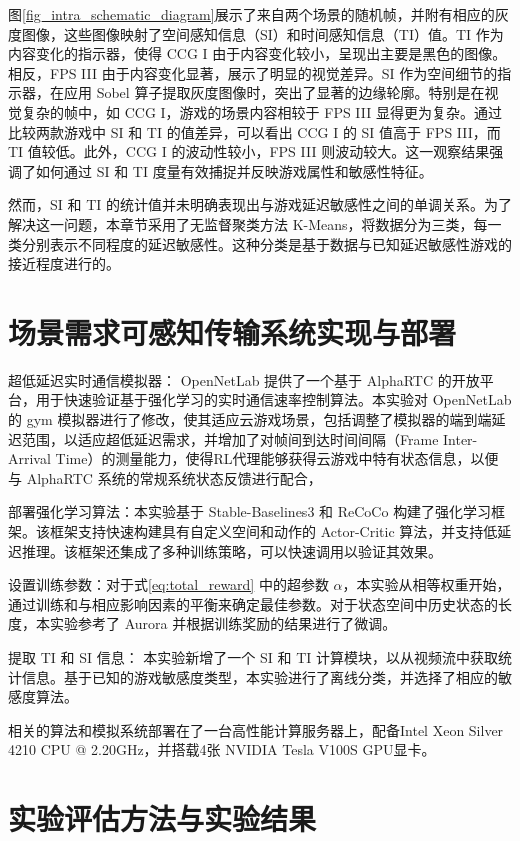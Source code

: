 图\ref{fig_intra_schematic_diagram}展示了来自两个场景的随机帧，并附有相应的灰度图像，这些图像映射了空间感知信息（SI）和时间感知信息（TI）值。TI 作为内容变化的指示器，使得 CCG I 由于内容变化较小，呈现出主要是黑色的图像。相反，FPS III 由于内容变化显著，展示了明显的视觉差异。SI 作为空间细节的指示器，在应用 Sobel 算子提取灰度图像时，突出了显著的边缘轮廓。特别是在视觉复杂的帧中，如 CCG I，游戏的场景内容相较于 FPS III 显得更为复杂。通过比较两款游戏中 SI 和 TI 的值差异，可以看出 CCG I 的 SI 值高于 FPS III，而 TI 值较低。此外，CCG I 的波动性较小，FPS III 则波动较大。这一观察结果强调了如何通过 SI 和 TI 度量有效捕捉并反映游戏属性和敏感性特征。

然而，SI 和 TI 的统计值并未明确表现出与游戏延迟敏感性之间的单调关系。为了解决这一问题，本章节采用了无监督聚类方法 K-Means，将数据分为三类，每一类分别表示不同程度的延迟敏感性。这种分类是基于数据与已知延迟敏感性游戏的接近程度进行的。

\section{场景需求可感知传输系统实现与部署}
超低延迟实时通信模拟器： OpenNetLab \cite{eo2022opennetlab} 提供了一个基于 AlphaRTC 的开放平台，用于快速验证基于强化学习的实时通信速率控制算法。本实验对 OpenNetLab 的 gym 模拟器进行了修改，使其适应云游戏场景，包括调整了模拟器的端到端延迟范围，以适应超低延迟需求，并增加了对帧间到达时间间隔（Frame Inter-Arrival Time）的测量能力，使得RL代理能够获得云游戏中特有状态信息，以便与 AlphaRTC 系统的常规系统状态反馈进行配合，

部署强化学习算法：本实验基于 Stable-Baselines3 \cite{stable-baselines3} 和 ReCoCo \cite{markudova2023recoco} 构建了强化学习框架。该框架支持快速构建具有自定义空间和动作的 Actor-Critic 算法，并支持低延迟推理。该框架还集成了多种训练策略，可以快速调用以验证其效果。

设置训练参数：对于式\eqref{eq:total_reward} 中的超参数 $\alpha$，本实验从相等权重开始，通过训练和与相应影响因素的平衡来确定最佳参数。对于状态空间中历史状态的长度，本实验参考了 Aurora \cite{markudova2023recoco} 并根据训练奖励的结果进行了微调。

提取 TI 和 SI 信息： 本实验新增了一个 SI 和 TI 计算模块，以从视频流中获取统计信息。基于已知的游戏敏感度类型，本实验进行了离线分类，并选择了相应的敏感度算法。

相关的算法和模拟系统部署在了一台高性能计算服务器上，配备Intel Xeon Silver 4210 CPU @ 2.20GHz，并搭载4张 NVIDIA Tesla V100S GPU显卡。
\section{实验评估方法与实验结果}
